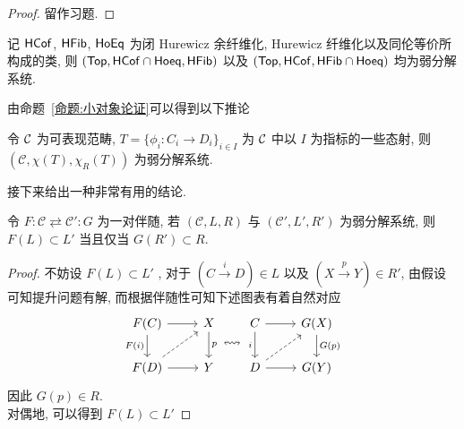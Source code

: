 \begin{proof}
    留作习题.
\end{proof}
\begin{example}
    记 $\mathsf{HCof}$, $\mathsf{HFib}$, $\mathsf{HoEq}$ 为闭 Hurewicz 余纤维化, Hurewicz 纤维化以及同伦等价所构成的类, 则 $(\mathsf{Top}, \mathsf{HCof}\cap \mathsf{Hoeq}, \mathsf{HFib})$ 以及 $(\mathsf{Top}, \mathsf{HCof}, \mathsf{HFib}\cap \mathsf{Hoeq})$ 均为弱分解系统.
\end{example}
由命题~\ref{命题:小对象论证}可以得到以下推论
\begin{corollary}
    令 $\cal{C}$ 为可表现范畴, $T = \{\phi_i : C_i \to D_i\}_{i\in I}$ 为 $\cal{C}$ 中以 $I$ 为指标的一些态射, 则 $(\mathcal{C},\chi(T),\chi_R(T))$ 为弱分解系统.
\end{corollary}
接下来给出一种非常有用的结论.
\begin{proposition}
    令 $F\colon \mathcal{C} \rightleftarrows \mathcal{C}'\colon G$ 为一对伴随, 若 $(\mathcal{C},L,R)$ 与 $(\mathcal{C}',L',R')$ 为弱分解系统, 则 $F(L)\subset L'$ 当且仅当 $G(R')\subset R$.
\end{proposition}
\begin{proof}
    不妨设 $F(L)\subset L'$ , 对于 $(C\xrightarrow{i}D)\in L$ 以及 $(X\xrightarrow{p}Y)\in R'$, 由假设可知提升问题有解, 而根据伴随性可知下述图表有着自然对应
    \[\begin{tikzcd}
	{F(C)} & X \\
	{F(D)} & Y
	\arrow[from=1-1, to=1-2]
	\arrow["{F(i)}"', from=1-1, to=2-1]
	\arrow["p", from=1-2, to=2-2]
	\arrow[dashed, from=2-1, to=1-2]
	\arrow[from=2-1, to=2-2]
    \end{tikzcd} \leftrightsquigarrow  \begin{tikzcd}
	C & {G(X)} \\
	D & {G(Y)}
	\arrow[from=1-1, to=1-2]
	\arrow["i"', from=1-1, to=2-1]
	\arrow["{G(p)}", from=1-2, to=2-2]
	\arrow[dashed, from=2-1, to=1-2]
	\arrow[from=2-1, to=2-2]
\end{tikzcd}\]
因此 $G(p)\in R$.\\
对偶地, 可以得到 $F(L) \subset L'$
\end{proof}
